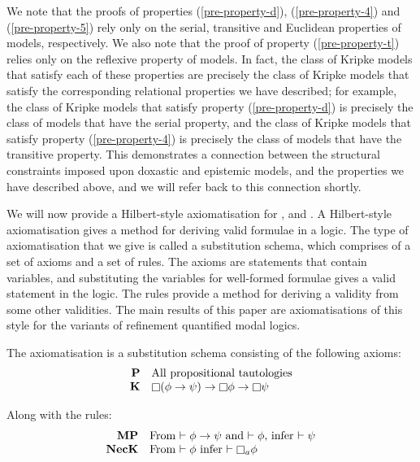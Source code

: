 We note that the proofs of properties (\ref{pre-property-d}),
(\ref{pre-property-4}) and (\ref{pre-property-5}) rely only on the serial,
transitive and Euclidean properties of \classKD{} models, respectively. We also
note that the proof of property (\ref{pre-property-t}) relies only on the
reflexive property of \classS{} models. In fact, the class of Kripke models that
satisfy each of these properties are precisely the class of Kripke models that
satisfy the corresponding relational properties we have described; for example,
the class of Kripke models that satisfy property (\ref{pre-property-d}) is
precisely the class of models that have the serial property, and the class of
Kripke models that satisfy property (\ref{pre-property-4}) is precisely the
class of models that have the transitive property. This demonstrates a
connection between the structural constraints imposed upon doxastic and
epistemic models, and the properties we have described above, and we will refer
back to this connection shortly.

We will now provide a Hilbert-style axiomatisation for \logicK{}, \logicKD{} and
\logicS{}. A Hilbert-style axiomatisation gives a method for deriving valid
formulae in a logic. The type of axiomatisation that we give is called a
substitution schema, which comprises of a set of axioms and a set of rules. The
axioms are statements that contain variables, and substituting the variables for
well-formed formulae gives a valid statement in the logic. The rules provide a
method for deriving a validity from some other validities. The main results of
this paper are axiomatisations of this style for the variants of refinement
quantified modal logics.
 
\begin{definition}
The axiomatisation \axiomK{} is a substitution schema consisting of the
following axioms:
$$
\begin{array}{rl}
{\bf P} & \text{All propositional tautologies}\\
{\bf K} & \knows (\phi \implies \psi) \implies \knows \phi \implies \knows
\psi\\
\end{array}
$$

Along with the rules:
$$
\begin{array}{rl}
{\bf MP} & \text{From $\proves \phi \implies \psi$ and $\proves \phi$, infer
$\proves \psi$}\\
{\bf NecK} & \text{From $\proves \phi$ infer $\proves \knows_a \phi$}\\
\end{array}
$$
\end{definition}

